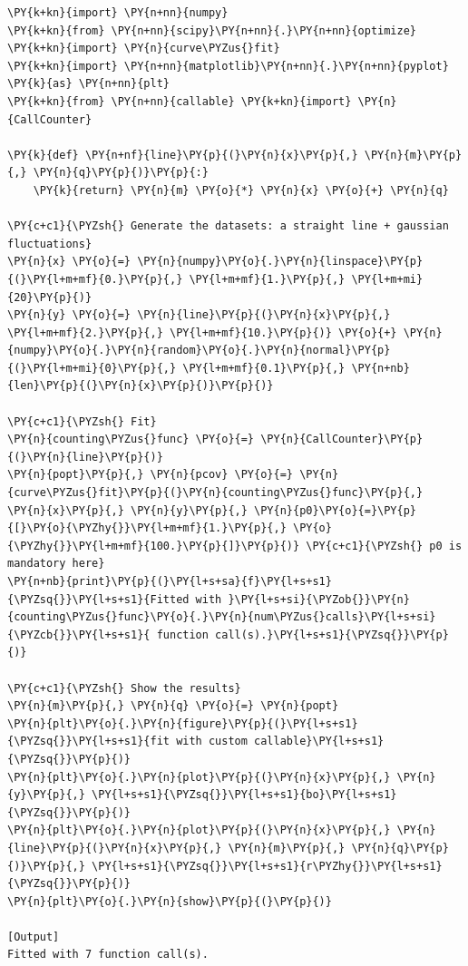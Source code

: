 \begin{Verbatim}[label=\makebox{\url{https://github.com/lucabaldini/cmepda/tree/master/slides/latex/snippets/test\_callable.py}},commandchars=\\\{\}]
\PY{k+kn}{import} \PY{n+nn}{numpy}
\PY{k+kn}{from} \PY{n+nn}{scipy}\PY{n+nn}{.}\PY{n+nn}{optimize} \PY{k+kn}{import} \PY{n}{curve\PYZus{}fit}
\PY{k+kn}{import} \PY{n+nn}{matplotlib}\PY{n+nn}{.}\PY{n+nn}{pyplot} \PY{k}{as} \PY{n+nn}{plt}
\PY{k+kn}{from} \PY{n+nn}{callable} \PY{k+kn}{import} \PY{n}{CallCounter}

\PY{k}{def} \PY{n+nf}{line}\PY{p}{(}\PY{n}{x}\PY{p}{,} \PY{n}{m}\PY{p}{,} \PY{n}{q}\PY{p}{)}\PY{p}{:}
    \PY{k}{return} \PY{n}{m} \PY{o}{*} \PY{n}{x} \PY{o}{+} \PY{n}{q}

\PY{c+c1}{\PYZsh{} Generate the datasets: a straight line + gaussian fluctuations}
\PY{n}{x} \PY{o}{=} \PY{n}{numpy}\PY{o}{.}\PY{n}{linspace}\PY{p}{(}\PY{l+m+mf}{0.}\PY{p}{,} \PY{l+m+mf}{1.}\PY{p}{,} \PY{l+m+mi}{20}\PY{p}{)}
\PY{n}{y} \PY{o}{=} \PY{n}{line}\PY{p}{(}\PY{n}{x}\PY{p}{,} \PY{l+m+mf}{2.}\PY{p}{,} \PY{l+m+mf}{10.}\PY{p}{)} \PY{o}{+} \PY{n}{numpy}\PY{o}{.}\PY{n}{random}\PY{o}{.}\PY{n}{normal}\PY{p}{(}\PY{l+m+mi}{0}\PY{p}{,} \PY{l+m+mf}{0.1}\PY{p}{,} \PY{n+nb}{len}\PY{p}{(}\PY{n}{x}\PY{p}{)}\PY{p}{)}

\PY{c+c1}{\PYZsh{} Fit}
\PY{n}{counting\PYZus{}func} \PY{o}{=} \PY{n}{CallCounter}\PY{p}{(}\PY{n}{line}\PY{p}{)}
\PY{n}{popt}\PY{p}{,} \PY{n}{pcov} \PY{o}{=} \PY{n}{curve\PYZus{}fit}\PY{p}{(}\PY{n}{counting\PYZus{}func}\PY{p}{,} \PY{n}{x}\PY{p}{,} \PY{n}{y}\PY{p}{,} \PY{n}{p0}\PY{o}{=}\PY{p}{[}\PY{o}{\PYZhy{}}\PY{l+m+mf}{1.}\PY{p}{,} \PY{o}{\PYZhy{}}\PY{l+m+mf}{100.}\PY{p}{]}\PY{p}{)} \PY{c+c1}{\PYZsh{} p0 is mandatory here}
\PY{n+nb}{print}\PY{p}{(}\PY{l+s+sa}{f}\PY{l+s+s1}{\PYZsq{}}\PY{l+s+s1}{Fitted with }\PY{l+s+si}{\PYZob{}}\PY{n}{counting\PYZus{}func}\PY{o}{.}\PY{n}{num\PYZus{}calls}\PY{l+s+si}{\PYZcb{}}\PY{l+s+s1}{ function call(s).}\PY{l+s+s1}{\PYZsq{}}\PY{p}{)}

\PY{c+c1}{\PYZsh{} Show the results}
\PY{n}{m}\PY{p}{,} \PY{n}{q} \PY{o}{=} \PY{n}{popt}
\PY{n}{plt}\PY{o}{.}\PY{n}{figure}\PY{p}{(}\PY{l+s+s1}{\PYZsq{}}\PY{l+s+s1}{fit with custom callable}\PY{l+s+s1}{\PYZsq{}}\PY{p}{)}
\PY{n}{plt}\PY{o}{.}\PY{n}{plot}\PY{p}{(}\PY{n}{x}\PY{p}{,} \PY{n}{y}\PY{p}{,} \PY{l+s+s1}{\PYZsq{}}\PY{l+s+s1}{bo}\PY{l+s+s1}{\PYZsq{}}\PY{p}{)}
\PY{n}{plt}\PY{o}{.}\PY{n}{plot}\PY{p}{(}\PY{n}{x}\PY{p}{,} \PY{n}{line}\PY{p}{(}\PY{n}{x}\PY{p}{,} \PY{n}{m}\PY{p}{,} \PY{n}{q}\PY{p}{)}\PY{p}{,} \PY{l+s+s1}{\PYZsq{}}\PY{l+s+s1}{r\PYZhy{}}\PY{l+s+s1}{\PYZsq{}}\PY{p}{)}
\PY{n}{plt}\PY{o}{.}\PY{n}{show}\PY{p}{(}\PY{p}{)}

[Output]
Fitted with 7 function call(s).
\end{Verbatim}